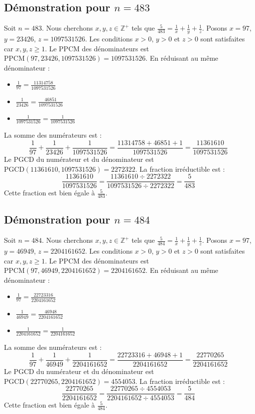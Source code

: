 \documentclass[11pt,a4paper]{article}
\begin{document}
\subsection{Démonstration pour $n = 483$}
Soit $n = 483$. Nous cherchons $x, y, z \in \mathbb{Z}^{+}$ tels que $\frac{5}{483} = \frac{1}{x} + \frac{1}{y} + \frac{1}{z}$.
Posons $x = 97$, $y = 23426$, $z = 1097531526$.
Les conditions $x > 0$, $y > 0$ et $z > 0$ sont satisfaites car $x, y, z \geq 1$.
Le PPCM des dénominateurs est $\text{PPCM}(97, 23426, 1097531526) = 1097531526$.
En réduisant au même dénominateur :
\begin{itemize}
    \item $\frac{1}{97} = \frac{11314758}{1097531526}$
    \item $\frac{1}{23426} = \frac{46851}{1097531526}$
    \item $\frac{1}{1097531526} = \frac{1}{1097531526}$
\end{itemize}
La somme des numérateurs est :
$$ \frac{1}{97} + \frac{1}{23426} + \frac{1}{1097531526} = \frac{11314758 + 46851 + 1}{1097531526} = \frac{11361610}{1097531526} $$
Le PGCD du numérateur et du dénominateur est $\text{PGCD}(11361610, 1097531526) = 2272322$.
La fraction irréductible est :
$$ \frac{11361610}{1097531526} = \frac{11361610 \div 2272322}{1097531526 \div 2272322} = \frac{5}{483} $$
Cette fraction est bien égale à $\frac{5}{483}$.

\subsection{Démonstration pour $n = 484$}
Soit $n = 484$. Nous cherchons $x, y, z \in \mathbb{Z}^{+}$ tels que $\frac{5}{484} = \frac{1}{x} + \frac{1}{y} + \frac{1}{z}$.
Posons $x = 97$, $y = 46949$, $z = 2204161652$.
Les conditions $x > 0$, $y > 0$ et $z > 0$ sont satisfaites car $x, y, z \geq 1$.
Le PPCM des dénominateurs est $\text{PPCM}(97, 46949, 2204161652) = 2204161652$.
En réduisant au même dénominateur :
\begin{itemize}
    \item $\frac{1}{97} = \frac{22723316}{2204161652}$
    \item $\frac{1}{46949} = \frac{46948}{2204161652}$
    \item $\frac{1}{2204161652} = \frac{1}{2204161652}$
\end{itemize}
La somme des numérateurs est :
$$ \frac{1}{97} + \frac{1}{46949} + \frac{1}{2204161652} = \frac{22723316 + 46948 + 1}{2204161652} = \frac{22770265}{2204161652} $$
Le PGCD du numérateur et du dénominateur est $\text{PGCD}(22770265, 2204161652) = 4554053$.
La fraction irréductible est :
$$ \frac{22770265}{2204161652} = \frac{22770265 \div 4554053}{2204161652 \div 4554053} = \frac{5}{484} $$
Cette fraction est bien égale à $\frac{5}{484}$.
\end{document}
